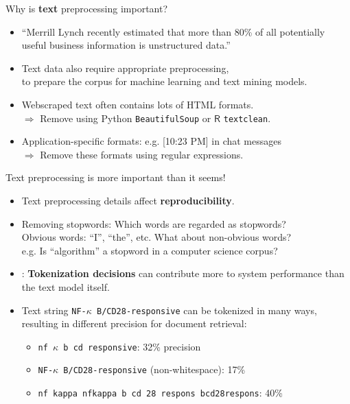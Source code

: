 \documentclass{beamer}
\renewcommand{\cite}{\citep}
\begin{document}
\begin{frame}{Why is \textbf{\color{yellow}text} preprocessing important?}
\begin{itemize}
\item ``Merrill Lynch recently estimated that more than 80\% of all potentially useful business information is unstructured data.''~\cite{gharehchopogh2011analysis}
	\bigskip
\item Text data also require appropriate preprocessing,\\ to prepare the corpus for machine learning and text mining models.~\cite{kalra2018importance}
	\bigskip
\item Webscraped text often contains lots of HTML formats.\\
	$\Rightarrow$ Remove using Python \texttt{BeautifulSoup} or $\mathsf{R}$ \texttt{textclean}.
\item Application-specific formats: e.g. [10:23 PM] in chat messages\\
	$\Rightarrow$ Remove these formats using regular expressions.
\end{itemize}
\end{frame}

\begin{frame}{Text preprocessing is more important than it seems!}
\begin{itemize}
\item Text preprocessing details affect \textbf{reproducibility}.{\small~\cite{roy2018clean}}
\item Removing stopwords: Which words are regarded as stopwords?\\
	Obvious words: ``I'', ``the'', etc. What about non-obvious words?\\
	e.g. Is ``algorithm'' a stopword in a computer science corpus?
	\bigskip
\item\citet{trieschnigg2007influence}: \textbf{Tokenization decisions} can contribute more to system performance than the text model itself.
	\bigskip
\item Text string \texttt{NF-$\kappa$ B/CD28-responsive} can be tokenized in many ways, resulting in different precision for document retrieval:
	\begin{itemize}
	\small
	\item \texttt{nf $\kappa$ b cd responsive}: 32\% precision
	\item \texttt{NF-$\kappa$ B/CD28-responsive} (non-whitespace): 17\%
	\item \texttt{nf kappa nfkappa b cd 28 respons bcd28respons}: 40\%
	\end{itemize}
\end{itemize}
\end{frame}
\end{document}

